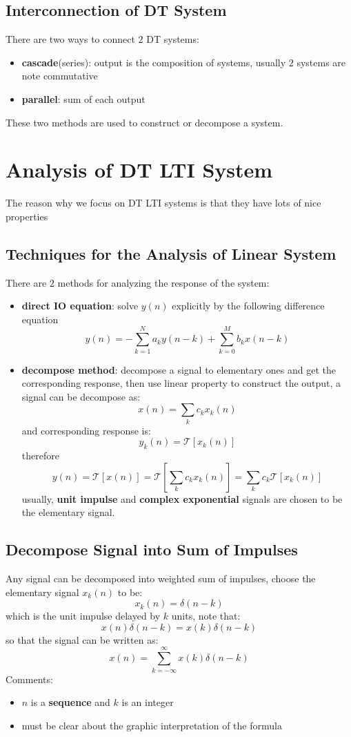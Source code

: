 \documentclass[10pt,a4paper,oneside]{article}
\begin{document}
\subsection{Interconnection of DT System}
There are two ways to connect $2$ DT systems:
\begin{itemize}
	\item \textbf{cascade}(series): output is the composition of systems, usually $2$ systems are note commutative
	\item \textbf{parallel}: sum of each output
\end{itemize}
These two methods are used to construct or decompose a system.

\section{Analysis of DT LTI System}
The reason why we focus on DT LTI systems is that they have lots of nice properties

\subsection{Techniques for the Analysis of Linear System}
There are $2$ methods for analyzing the response of the system:
\begin{itemize}
	\item \textbf{direct IO equation}: solve $y(n)$ explicitly by the following difference equation
	\[
	y(n) = - \sum_{k=1}^{N}a_k y(n-k) + \sum_{k=0}^{M} b_k x(n-k)
	\]
	\item \textbf{decompose method}: decompose a signal to elementary ones and get the corresponding response, then use linear property to construct the output, a signal can be decompose as:
	\[
	x(n) = \sum_{k} c_k x_k(n)
	\]
	and corresponding response is:
	\[
	y_k(n) = \mathcal{T}[x_k(n)]
	\]
	therefore
	\[
	y(n) = \mathcal{T}[x(n)] = \mathcal{T}\left[\sum_{k} c_k x_k(n)\right] = \sum_{k} c_k \mathcal{T} [x_k(n)]
	\]
	usually, \textbf{unit impulse} and \textbf{complex exponential} signals are chosen to be the elementary signal.
\end{itemize} 

\subsection{Decompose Signal into Sum of Impulses}
Any signal can be decomposed into weighted sum of impulses, choose the elementary signal $x_k (n)$ to be:
\[
x_k (n) = \delta(n-k)
\]
which is the unit impulse delayed by $k$ units, note that:
\[
x(n) \delta(n-k) = x(k) \delta(n-k)
\]
so that the signal can be written as:
\[
x(n) = \sum_{k=-\infty}^{\infty} x(k) \delta(n-k)
\]
Comments:
\begin{itemize}
	\item $n$ is a \textbf{sequence} and $k$ is an integer
	\item must be clear about the graphic interpretation of the formula 
\end{itemize}
\end{document}
